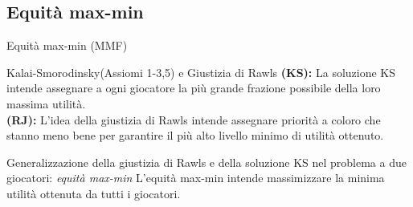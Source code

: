 \documentclass{beamer}
\begin{document}
\subsection{Equità max-min}

\begin{frame}{Equità max-min (MMF)}
	\begin{block}{Kalai-Smorodinsky(Assiomi 1-3,5) e Giustizia di Rawls}
		\textbf{(KS):} La soluzione KS intende assegnare a ogni giocatore la più grande frazione possibile della loro massima utilità.\\
	\textbf{(RJ):} L'idea della giustizia di Rawls intende assegnare priorità a coloro che stanno meno bene per garantire il più alto livello minimo di utilità ottenuto.
\end{block}
	\begin{block}{Generalizzazione della giustizia di Rawls e della soluzione KS nel problema a due giocatori: \textit{equità max-min} }
		L'equità max-min intende massimizzare la minima utilità ottenuta da tutti i giocatori.
	\end{block}
\end{frame}
\end{document}
